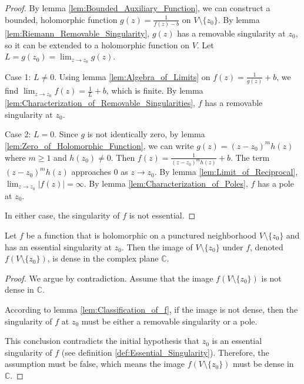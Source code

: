 \begin{proof}
    By lemma \ref{lem:Bounded_Auxiliary_Function}, we can construct a bounded, holomorphic function $g(z) = \frac{1}{f(z) - b}$ on $V \setminus \{z_0\}$. By lemma \ref{lem:Riemann_Removable_Singularity}, $g(z)$ has a removable singularity at $z_0$, so it can be extended to a holomorphic function on $V$. Let $L = g(z_0) = \lim_{z \to z_0} g(z)$.

    Case 1: $L \neq 0$. Using lemma \ref{lem:Algebra_of_Limits} on $f(z) = \frac{1}{g(z)} + b$, we find $\lim_{z \to z_0} f(z) = \frac{1}{L} + b$, which is finite. By lemma \ref{lem:Characterization_of_Removable_Singularities}, $f$ has a removable singularity at $z_0$.

    Case 2: $L = 0$. Since $g$ is not identically zero, by lemma \ref{lem:Zero_of_Holomorphic_Function}, we can write $g(z) = (z-z_0)^m h(z)$ where $m \geq 1$ and $h(z_0) \neq 0$. Then $f(z) = \frac{1}{(z-z_0)^m h(z)} + b$. The term $(z-z_0)^m h(z)$ approaches $0$ as $z \to z_0$. By lemma \ref{lem:Limit_of_Reciprocal}, $\lim_{z \to z_0} |f(z)| = \infty$. By lemma \ref{lem:Characterization_of_Poles}, $f$ has a pole at $z_0$.

    In either case, the singularity of $f$ is not essential.
\end{proof}

\begin{theorem}
    \label{thm:Casorati-Weierstrass_Theorem}
    Let $f$ be a function that is holomorphic on a punctured neighborhood $V \setminus \{z_0\}$ and has an essential singularity at $z_0$. Then the image of $V \setminus \{z_0\}$ under $f$, denoted $f(V \setminus \{z_0\})$, is dense in the complex plane $\mathbb{C}$.
\end{theorem}

\begin{proof}
    We argue by contradiction. Assume that the image $f(V \setminus \{z_0\})$ is not dense in $\mathbb{C}$.
    
    According to lemma \ref{lem:Classification_of_f}, if the image is not dense, then the singularity of $f$ at $z_0$ must be either a removable singularity or a pole.
    
    This conclusion contradicts the initial hypothesis that $z_0$ is an essential singularity of $f$ (see definition \ref{def:Essential_Singularity}). Therefore, the assumption must be false, which means the image $f(V \setminus \{z_0\})$ must be dense in $\mathbb{C}$.
\end{proof}